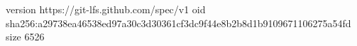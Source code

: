 version https://git-lfs.github.com/spec/v1
oid sha256:a29738ea46538ed97a30c3d30361cf3dc9f44e8b2b8d1b9109671106275a54fd
size 6526
